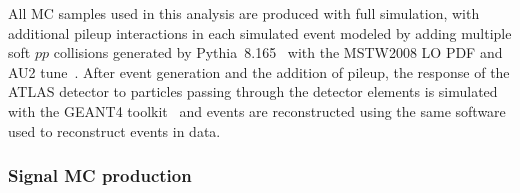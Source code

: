 




All MC samples used in this analysis are produced with full simulation, with additional pileup interactions in each simulated event 
modeled by adding multiple soft $pp$ collisions
generated by Pythia~8.165~\cite{pythia8} with the MSTW2008 LO PDF and AU2 tune~\cite{MC12AU2}.  After event generation and the addition of pileup, 
the response of the ATLAS detector to particles
passing through the detector elements is simulated with the GEANT4 toolkit~\cite{Geant4,simulation}
and events are reconstructed using the same software used to reconstruct events in data.

\subsubsection{Signal MC production}

